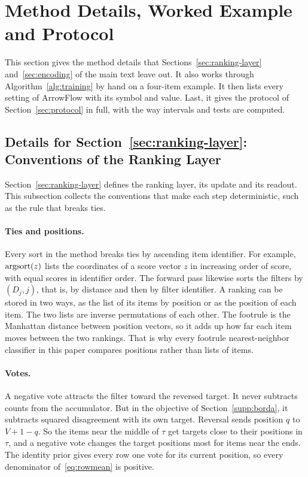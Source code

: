 \section{Method Details, Worked Example and Protocol}\label{supp:protocol}

This section gives the method details that Sections~\ref{sec:ranking-layer} and~\ref{sec:encoding} of the main text leave out. It also works through Algorithm~\ref{alg:training} by hand on a four-item example. It then lists every setting of ArrowFlow with its symbol and value. Last, it gives the protocol of Section~\ref{sec:protocol} in full, with the way intervals and tests are computed.

\subsection{Details for Section~\ref*{sec:ranking-layer}: Conventions of the Ranking Layer}\label{supp:layer}

Section~\ref{sec:ranking-layer} defines the ranking layer, its update and its readout. This subsection collects the conventions that make each step deterministic, such as the rule that breaks ties.

\paragraph{Ties and positions.} Every sort in the method breaks ties by ascending item identifier. For example, $\mathrm{argsort}(z)$ lists the coordinates of a score vector $z$ in increasing order of score, with equal scores in identifier order. The forward pass likewise sorts the filters by $(D_j,j)$, that is, by distance and then by filter identifier. A ranking can be stored in two ways, as the list of its items by position or as the position of each item. The two lists are inverse permutations of each other. The footrule is the Manhattan distance between position vectors, so it adds up how far each item moves between the two rankings. That is why every footrule nearest-neighbor classifier in this paper compares positions rather than lists of items.

\paragraph{Votes.} A negative vote attracts the filter toward the reversed target. It never subtracts counts from the accumulator. But in the objective of Section~\ref{supp:borda}, it subtracts squared disagreement with its own target. Reversal sends position $q$ to $V+1-q$. So the items near the middle of $\tau$ get targets close to their positions in $\tau$, and a negative vote changes the target positions most for items near the ends. The identity prior gives every row one vote for its current position, so every denominator of~\eqref{eq:rowmean} is positive.


